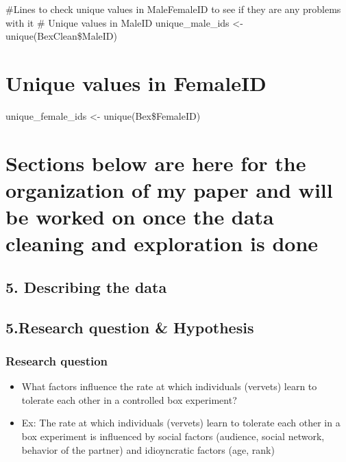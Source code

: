 \documentclass[
]{article}
\begin{document}
\#Lines to check unique values in MaleFemaleID to see if they are any
problems with it \# Unique values in MaleID unique\_male\_ids \textless-
unique(BexClean\$MaleID)

\hypertarget{unique-values-in-femaleid}{%
\section{Unique values in FemaleID}\label{unique-values-in-femaleid}}

unique\_female\_ids \textless- unique(Bex\$FemaleID)

\hypertarget{sections-below-are-here-for-the-organization-of-my-paper-and-will-be-worked-on-once-the-data-cleaning-and-exploration-is-done}{%
\section{Sections below are here for the organization of my paper and
will be worked on once the data cleaning and exploration is
done}\label{sections-below-are-here-for-the-organization-of-my-paper-and-will-be-worked-on-once-the-data-cleaning-and-exploration-is-done}}

\hypertarget{describing-the-data}{%
\subsection{5. Describing the data}\label{describing-the-data}}

\hypertarget{research-question-hypothesis}{%
\subsection{5.Research question \&
Hypothesis}\label{research-question-hypothesis}}

\hypertarget{research-question-1}{%
\subsubsection{Research question}\label{research-question-1}}

\begin{itemize}
\item
  What factors influence the rate at which individuals (vervets) learn
  to tolerate each other in a controlled box experiment?
\item
  Ex: The rate at which individuals (vervets) learn to tolerate each
  other in a box experiment is influenced by social factors (audience,
  social network, behavior of the partner) and idioyncratic factors
  (age, rank)
\end{itemize}
\end{document}
